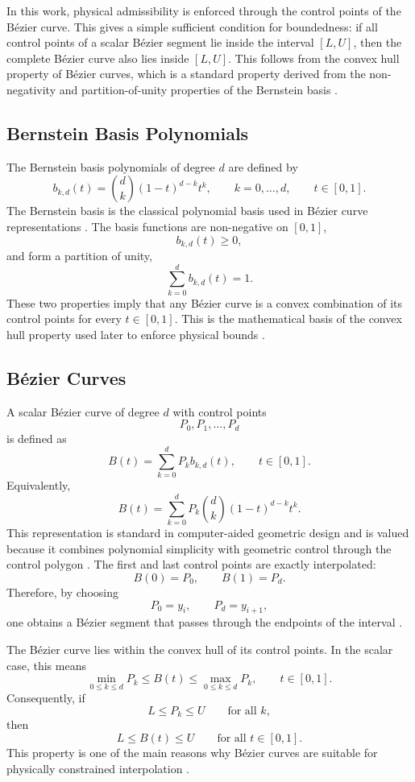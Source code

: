 \documentclass[12pt,a4paper]{article}
\begin{document}
In this work, physical admissibility is enforced through the control points of the B\'ezier curve. This gives a simple sufficient condition for boundedness: if all control points of a scalar B\'ezier segment lie inside the interval \([L,U]\), then the complete B\'ezier curve also lies inside \([L,U]\). This follows from the convex hull property of B\'ezier curves, which is a standard property derived from the non-negativity and partition-of-unity properties of the Bernstein basis \cite{farin2002curves,piegl1997nurbs,aaltoBezier2013,mitBezierProperties}.

\subsection{Bernstein Basis Polynomials}

The Bernstein basis polynomials of degree \(d\) are defined by
\[
b_{k,d}(t)=
\binom{d}{k}(1-t)^{d-k}t^k,
\qquad k=0,\dots,d,
\qquad t\in[0,1].
\]
The Bernstein basis is the classical polynomial basis used in B\'ezier curve representations \cite{farin2002curves,piegl1997nurbs,pomaxBezierPrimer}. The basis functions are non-negative on \([0,1]\),
\[
b_{k,d}(t)\geq 0,
\]
and form a partition of unity,
\[
\sum_{k=0}^{d} b_{k,d}(t)=1.
\]
These two properties imply that any B\'ezier curve is a convex combination of its control points for every \(t\in[0,1]\). This is the mathematical basis of the convex hull property used later to enforce physical bounds \cite{aaltoBezier2013,mitBezierProperties}.

\subsection{B\'ezier Curves}

A scalar B\'ezier curve of degree \(d\) with control points
\[
P_0,P_1,\dots,P_d
\]
is defined as
\[
B(t)=
\sum_{k=0}^{d} P_k b_{k,d}(t),
\qquad t\in[0,1].
\]
Equivalently,
\[
B(t)=
\sum_{k=0}^{d}
P_k
\binom{d}{k}
(1-t)^{d-k}t^k.
\]
This representation is standard in computer-aided geometric design and is valued because it combines polynomial simplicity with geometric control through the control polygon \cite{farin2002curves,piegl1997nurbs}. The first and last control points are exactly interpolated:
\[
B(0)=P_0,
\qquad
B(1)=P_d.
\]
Therefore, by choosing
\[
P_0=y_i,
\qquad
P_d=y_{i+1},
\]
one obtains a B\'ezier segment that passes through the endpoints of the interval \cite{mitBezierProperties,farin2002curves}.

The B\'ezier curve lies within the convex hull of its control points. In the scalar case, this means
\[
\min_{0\leq k\leq d} P_k
\leq
B(t)
\leq
\max_{0\leq k\leq d} P_k,
\qquad t\in[0,1].
\]
Consequently, if
\[
L\leq P_k\leq U
\qquad \text{for all } k,
\]
then
\[
L\leq B(t)\leq U
\qquad \text{for all } t\in[0,1].
\]
This property is one of the main reasons why B\'ezier curves are suitable for physically constrained interpolation \cite{farin2002curves,piegl1997nurbs,aaltoBezier2013}.
\end{document}
